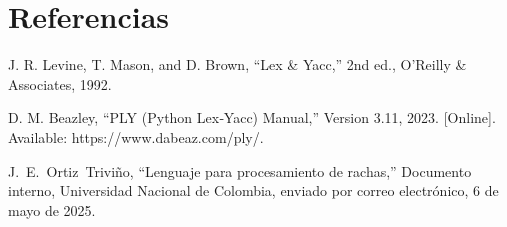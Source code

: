 \documentclass{article}
\begin{document}
\section{Referencias}
\renewcommand{\refname}{}

\begin{thebibliography}{9}


 \label{ref:lexPy1} J. R. Levine, T. Mason, and D. 
Brown, “Lex \& Yacc,” 2nd ed., O’Reilly \& Associates, 1992.

 \label{ref:lexPy2}  D. M. Beazley, “PLY (Python Lex‐Yacc)
Manual,” Version 3.11, 2023. [Online]. Available: https://www.dabeaz.com/ply/.

 \label{ref:rachas} J.~E.~Ortiz~Triviño, ``Lenguaje para 
  procesamiento de rachas,'' Documento interno, Universidad Nacional de 
    Colombia, enviado por correo electrónico, 6 de mayo de 2025.

\end{thebibliography}
\end{document}
